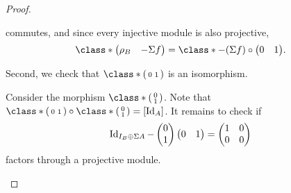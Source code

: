 \begin{proof}
\begin{enumerate}[label={(\bfseries TR\arabic*)}]
{\begin{center}
            \end{center}
            commutes, and since every injective module is also projective,
            \[
                \class*{
                    \begin{pmatrix}
                        \rho_B & -\Sigma f
                    \end{pmatrix}
                }
                =
                \class*{
                    -(\Sigma f) \circ
                    \begin{pmatrix}
                        0 & 1
                    \end{pmatrix}
                }.
            \]

            Second, we check that \( \class*{
                \begin{psmallmatrix}
                    0 & 1
                \end{psmallmatrix}
            } \) is an isomorphism.

            Consider the morphism \( \class*{
                \begin{psmallmatrix}
                    0 \\
                    1
                \end{psmallmatrix}
            } \).
            Note that \( \class*{
                \begin{psmallmatrix}
                    0 & 1
                \end{psmallmatrix}
            } \circ \class*{
                \begin{psmallmatrix}
                    0 \\
                    1
                \end{psmallmatrix}
            } = [\Id_A] \).
            It remains to check if
            \[
                \operatorname{Id}_{I_B \oplus \Sigma A} -
                \begin{pmatrix}
                    0 \\
                    1
                \end{pmatrix}
                \begin{pmatrix}
                    0 & 1
                \end{pmatrix}
                =
                \begin{pmatrix}
                    1 & 0 \\
                    0 & 0
                \end{pmatrix}
            \]
            factors through a projective module.

}
\end{enumerate}
\end{proof}
